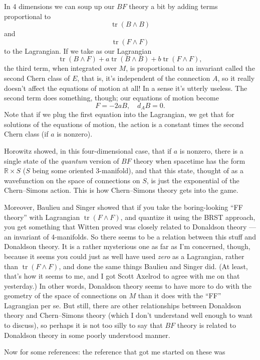 \documentclass[12pt]{article}
\begin{document}
In 4 dimensions we can soup up our \(BF\) theory a bit by adding terms
proportional to \[\operatorname{tr}(B \wedge B)\] and
\[\operatorname{tr}(F \wedge F)\] to the Lagrangian. If we take as our
Lagrangian
\[\operatorname{tr}(B \wedge F) + a \operatorname{tr}(B \wedge B) + b \operatorname{tr}(F \wedge F),\]
the third term, when integrated over \(M\), is proportional to an
invariant called the second Chern class of \(E\), that is, it's
independent of the connection \(A\), so it really doesn't affect the
equations of motion at all! In a sense it's utterly useless. The second
term does something, though; our equations of motion become
\[F = -2aB, \quad d_A B = 0.\] Note that if we plug the first equation
into the Lagrangian, we get that for solutions of the equations of
motion, the action is a constant times the second Chern class (if \(a\)
is nonzero).

Horowitz showed, in this four-dimensional case, that if \(a\) is
nonzero, there is a single state of the \emph{quantum} version of \(BF\)
theory when spacetime has the form \(\mathbb{R} \times S\) (\(S\) being
some oriented 3-manifold), and that this state, thought of as a
wavefunction on the space of connections on \(S\), is just the
exponential of the Chern--Simons action. This is how Chern--Simons theory
gets into the game.

Moreover, Baulieu and Singer showed that if you take the boring-looking
``FF theory'' with Lagrangian \(\operatorname{tr}(F \wedge F)\), and
quantize it using the BRST approach, you get something that Witten
proved was closely related to Donaldson theory --- an invariant of
4-manifolds. So there seems to be a relation between this stuff and
Donaldson theory. It is a rather mysterious one as far as I'm concerned,
though, because it seems you could just as well have used \emph{zero} as
a Lagrangian, rather than \(\operatorname{tr}(F \wedge F)\), and done
the same things Baulieu and Singer did. (At least, that's how it seems
to me, and I got Scott Axelrod to agree with me on that yesterday.) In
other words, Donaldson theory seems to have more to do with the geometry
of the space of connections on \(M\) than it does with the ``FF''
Lagrangian per se. But still, there are other relationships between
Donaldson theory and Chern--Simons theory (which I don't understand well
enough to want to discuss), so perhaps it is not too silly to say that
\(BF\) theory is related to Donaldson theory in some poorly understood
manner.

Now for some references: the reference that got me started on these was
\end{document}
